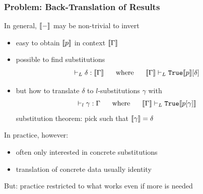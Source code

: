 \documentclass{beamer}
\begin{document}
\begin{frame}\frametitle{Problem: Back-Translation of Results}
In general, $\llbracket -\rrbracket$ may be non-trivial to invert
\begin{itemize}
\item easy to obtain $\llbracket p\rrbracket$ in context $\llbracket \Gamma\rrbracket$
\item possible to find substitutions
\[\vdash_L \delta:\llbracket \Gamma\rrbracket \hspace*{.5cm}\;\mathrm{where}\;\hspace*{.5cm} \llbracket \Gamma\rrbracket\vdash_L \mathtt{True} \llbracket p\rrbracket[\delta]\]
\item but how to translate $\delta$ to $l$-substitutions $\gamma$ with
 \[\vdash_l \gamma:\Gamma \hspace*{.5cm}\;\mathrm{where}\;\hspace*{.5cm} \llbracket \Gamma\rrbracket\vdash_L \mathtt{True} \llbracket p[\gamma]\rrbracket\]
 substitution theorem: pick such that $\llbracket \gamma\rrbracket=\delta$
\end{itemize}

In practice, however:
\begin{itemize}
\item often only interested in concrete substitutions
\item translation of concrete data usually identity
\end{itemize}
But: practice restricted to what works even if more is needed
\end{frame}

\end{document}
